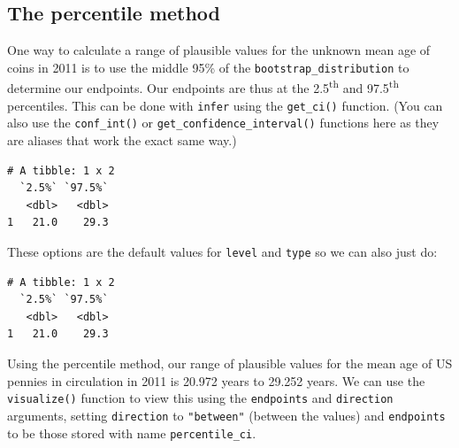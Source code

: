 \documentclass[12pt, krantz2,]{krantz}
\makeatletter
\newenvironment{Shaded}{\begin{snugshade}}{\end{snugshade}}
\newcommand{\DataTypeTok}[1]{\textcolor[rgb]{0.27,0.27,0.27}{#1}}
\newcommand{\FloatTok}[1]{\textcolor[rgb]{0.06,0.06,0.06}{#1}}
\newcommand{\KeywordTok}[1]{\textcolor[rgb]{0.27,0.27,0.27}{\textbf{#1}}}
\newcommand{\NormalTok}[1]{#1}
\newcommand{\OperatorTok}[1]{\textcolor[rgb]{0.43,0.43,0.43}{\textbf{#1}}}
\newcommand{\StringTok}[1]{\textcolor[rgb]{0.5,0.5,0.5}{#1}}
\newenvironment{kframe}{%
\medskip{}
\setlength{\fboxsep}{.8em}
 \def\at@end@of@kframe{}%
 \ifinner\ifhmode%
  \def\at@end@of@kframe{\end{minipage}}%
  \begin{minipage}{\columnwidth}%
 \fi\fi%
 \def\FrameCommand##1{\hskip\@totalleftmargin \hskip-\fboxsep
 \colorbox{shadecolor}{##1}\hskip-\fboxsep
     \hskip-\linewidth \hskip-\@totalleftmargin \hskip\columnwidth}%
 \MakeFramed {\advance\hsize-\width
   \@totalleftmargin\z@ \linewidth\hsize
   \@setminipage}}%
 {\par\unskip\endMakeFramed%
 \at@end@of@kframe}
\renewenvironment{Shaded}{\begin{kframe}}{\end{kframe}}
\makeatother
\begin{document}
\hypertarget{percentile-method}{%
\subsection{The percentile method}\label{percentile-method}}

One way to calculate a range of plausible values for the unknown mean age of coins in 2011 is to use the middle 95\% of the \texttt{bootstrap\_distribution} to determine our endpoints. Our endpoints are thus at the 2.5\textsuperscript{th} and 97.5\textsuperscript{th} percentiles. This can be done with \texttt{infer} using the \texttt{get\_ci()} function. (You can also use the \texttt{conf\_int()} or \texttt{get\_confidence\_interval()} functions here as they are aliases that work the exact same way.)

\begin{Shaded}
\end{Shaded}

\begin{verbatim}
# A tibble: 1 x 2
  `2.5%` `97.5%`
   <dbl>   <dbl>
1   21.0    29.3
\end{verbatim}

These options are the default values for \texttt{level} and \texttt{type} so we can also just do:

\begin{Shaded}
\end{Shaded}

\begin{verbatim}
# A tibble: 1 x 2
  `2.5%` `97.5%`
   <dbl>   <dbl>
1   21.0    29.3
\end{verbatim}

Using the percentile method, our range of plausible values for the mean age of US pennies in circulation in 2011 is 20.972 years to 29.252 years. We can use the \texttt{visualize()} function to view this using the \texttt{endpoints} and \texttt{direction} arguments, setting \texttt{direction} to \texttt{"between"} (between the values) and \texttt{endpoints} to be those stored with name \texttt{percentile\_ci}.
\end{document}
